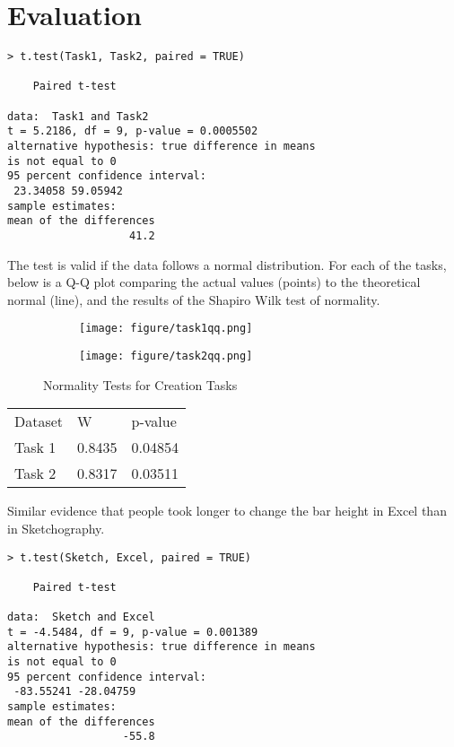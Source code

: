 \chapter{Evaluation}

\begin{verbatim}
> t.test(Task1, Task2, paired = TRUE)

	Paired t-test

data:  Task1 and Task2
t = 5.2186, df = 9, p-value = 0.0005502
alternative hypothesis: true difference in means 
is not equal to 0
95 percent confidence interval:
 23.34058 59.05942
sample estimates:
mean of the differences 
                   41.2 
\end{verbatim}

The test is valid if the data follows a normal distribution. For each of the tasks, below is a Q-Q plot comparing the actual values (points) to the theoretical normal (line), and the results of the Shapiro Wilk test of normality.

\begin{figure}[H]
		\centering
		\begin{subfigure}[b]{\textwidth}
			\texttt{[image: figure/task1qq.png]}
		\end{subfigure}
		\begin{subfigure}[b]{\textwidth}
			\texttt{[image: figure/task2qq.png]}
		\end{subfigure}
		\caption{Normality Tests for Creation Tasks}
	\end{figure}

\begin{tabular}{l l l}
Dataset & W & p-value \\
Task 1 & 0.8435 & 0.04854 \\
Task 2 & 0.8317 & 0.03511 \\
\end{tabular}



Similar evidence that people took longer to change the bar height in Excel than in Sketchography.

\begin{verbatim}
> t.test(Sketch, Excel, paired = TRUE)

	Paired t-test

data:  Sketch and Excel
t = -4.5484, df = 9, p-value = 0.001389
alternative hypothesis: true difference in means 
is not equal to 0
95 percent confidence interval:
 -83.55241 -28.04759
sample estimates:
mean of the differences 
                  -55.8 
\end{verbatim}

